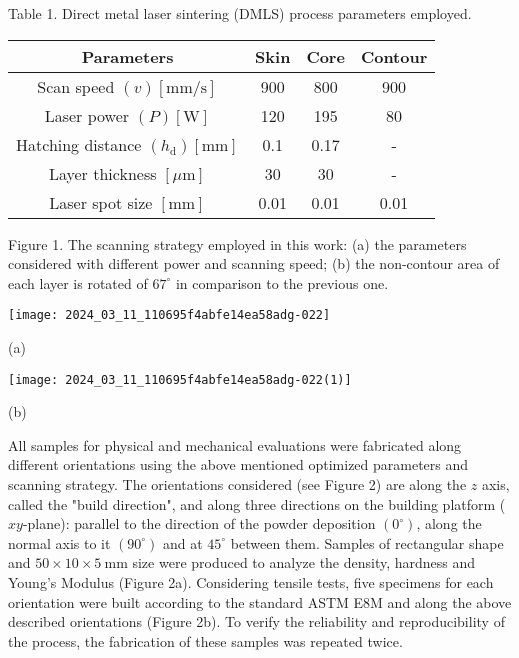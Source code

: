 \documentclass[10pt]{article}
\begin{document}
Table 1. Direct metal laser sintering (DMLS) process parameters employed.

\begin{center}
\begin{tabular}{cccc}
\hline
Parameters & Skin & Core & Contour \\
\hline
Scan speed $(v)[\mathrm{mm} / \mathrm{s}]$ & 900 & 800 & 900 \\
Laser power $(P)[\mathrm{W}]$ & 120 & 195 & 80 \\
Hatching distance $\left(h_{\mathrm{d}}\right)[\mathrm{mm}]$ & 0.1 & 0.17 & - \\
Layer thickness $[\mu \mathrm{m}]$ & 30 & 30 & - \\
Laser spot size $[\mathrm{mm}]$ & 0.01 & 0.01 & 0.01 \\
\hline
\end{tabular}
\end{center}

Figure 1. The scanning strategy employed in this work: (a) the parameters considered with different power and scanning speed; (b) the non-contour area of each layer is rotated of $67^{\circ}$ in comparison to the previous one.

\begin{center}
\texttt{[image: 2024\_03\_11\_110695f4abfe14ea58adg-022]}
\end{center}

(a)

\begin{center}
\texttt{[image: 2024\_03\_11\_110695f4abfe14ea58adg-022(1)]}
\end{center}

(b)

All samples for physical and mechanical evaluations were fabricated along different orientations using the above mentioned optimized parameters and scanning strategy. The orientations considered (see Figure 2) are along the $z$ axis, called the "build direction", and along three directions on the building platform ( $x y$-plane): parallel to the direction of the powder deposition $\left(0^{\circ}\right)$, along the normal axis to it $\left(90^{\circ}\right)$ and at $45^{\circ}$ between them. Samples of rectangular shape and $50 \times 10 \times 5 \mathrm{~mm}$ size were produced to analyze the density, hardness and Young's Modulus (Figure 2a). Considering tensile tests, five specimens for each orientation were built according to the standard ASTM E8M and along the above described orientations (Figure 2b). To verify the reliability and reproducibility of the process, the fabrication of these samples was repeated twice.
\end{document}
